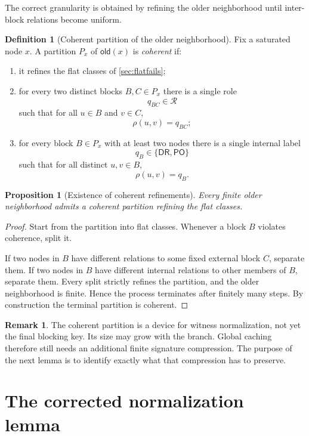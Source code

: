 \documentclass[11pt]{article}
\newtheorem{proposition}[theorem]{Proposition}
\theoremstyle{definition}
\newtheorem{definition}[theorem]{Definition}
\newtheorem{remark}[theorem]{Remark}
\newcommand{\Roles}{\mathcal{R}}
\newcommand{\DR}{\mathsf{DR}}
\newcommand{\PO}{\mathsf{PO}}
\newcommand{\older}{\mathsf{old}}
\begin{document}
The correct granularity is obtained by refining the older neighborhood until inter-block relations become uniform.

\begin{definition}[Coherent partition of the older neighborhood]\label{def:coherent}
Fix a saturated node $x$. A partition $P_x$ of $\older(x)$ is \emph{coherent} if:
\begin{enumerate}[label=(\roman*)]
  \item it refines the flat classes of \cref{sec:flatfails};
  \item for every two distinct blocks $B,C\in P_x$ there is a single role
  \[
  q_{BC}\in\Roles
  \]
  such that for all $u\in B$ and $v\in C$,
  \[
  \rho(u,v)=q_{BC};
  \]
  \item for every block $B\in P_x$ with at least two nodes there is a single internal label
  \[
  q_B\in\{\DR,\PO\}
  \]
  such that for all distinct $u,v\in B$,
  \[
  \rho(u,v)=q_B.
  \]
\end{enumerate}
\end{definition}

\begin{proposition}[Existence of coherent refinements]\label{prop:coherentexists}
Every finite older neighborhood admits a coherent partition refining the flat classes.
\end{proposition}

\begin{proof}
Start from the partition into flat classes. Whenever a block $B$ violates coherence, split it.

If two nodes in $B$ have different relations to some fixed external block $C$, separate them. If two nodes in $B$ have different internal relations to other members of $B$, separate them. Every split strictly refines the partition, and the older neighborhood is finite. Hence the process terminates after finitely many steps. By construction the terminal partition is coherent.
\end{proof}

\begin{remark}
The coherent partition is a device for witness normalization, not yet the final blocking key. Its size may grow with the branch. Global caching therefore still needs an additional finite signature compression. The purpose of the next lemma is to identify exactly what that compression has to preserve.
\end{remark}

\section{The corrected normalization lemma}
\end{document}
